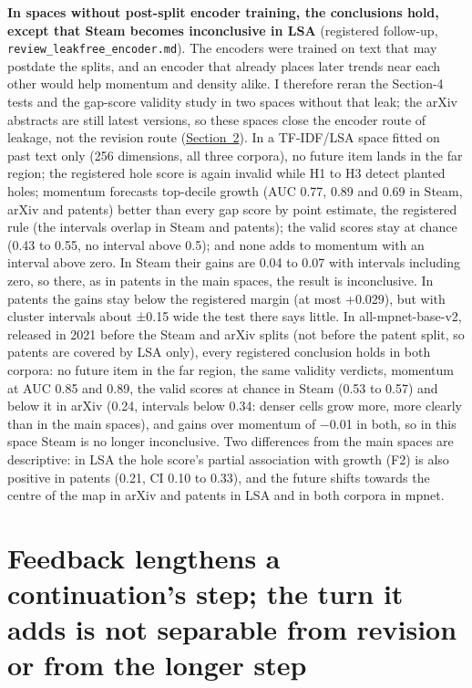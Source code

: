 \documentclass[
  10pt,
]{article}
\begin{document}
\textbf{In spaces without post-split
encoder training, the conclusions hold,
except that Steam becomes inconclusive
in LSA} (registered follow-up,
\texttt{review\_\allowbreak{}leakfree\_\allowbreak{}encoder.md}).
The encoders were trained on text that
may postdate the splits, and an encoder
that already places later trends near
each other would help momentum and
density alike. I therefore reran the
Section-4 tests and the gap-score
validity study in two spaces without
that leak; the arXiv abstracts are still
latest versions, so these spaces close
the encoder route of leakage, not the
revision route
(\hyperref[sec:2]{Section~2}). In a
TF-IDF/LSA space fitted on past text
only (256 dimensions, all three
corpora), no future item lands in the
far region; the registered hole score is
again invalid while H1 to H3 detect
planted holes; momentum forecasts
top-decile growth (AUC 0.77, 0.89 and
0.69 in Steam, arXiv and patents) better
than every gap score by point estimate,
the registered rule (the intervals
overlap in Steam and patents); the valid
scores stay at chance (0.43 to 0.55, no
interval above 0.5); and none adds to
momentum with an interval above zero. In
Steam their gains are 0.04 to 0.07 with
intervals including zero, so there, as
in patents in the main spaces, the
result is inconclusive. In patents the
gains stay below the registered margin
(at most +0.029), but with cluster
intervals about ±0.15 wide the test
there says little. In all-mpnet-base-v2,
released in 2021 before the Steam and
arXiv splits (not before the patent
split, so patents are covered by LSA
only), every registered conclusion holds
in both corpora: no future item in the
far region, the same validity verdicts,
momentum at AUC 0.85 and 0.89, the valid
scores at chance in Steam (0.53 to 0.57)
and below it in arXiv (0.24, intervals
below 0.34: denser cells grow more, more
clearly than in the main spaces), and
gains over momentum of −0.01 in both, so
in this space Steam is no longer
inconclusive. Two differences from the
main spaces are descriptive: in LSA the
hole score's partial association with
growth (F2) is also positive in patents
(0.21, CI 0.10 to 0.33), and the future
shifts towards the centre of the map in
arXiv and patents in LSA and in both
corpora in mpnet.

\section{Feedback lengthens a continuation's step; the turn it adds is not separable from revision or from the longer step}\label{sec:5}
\end{document}
